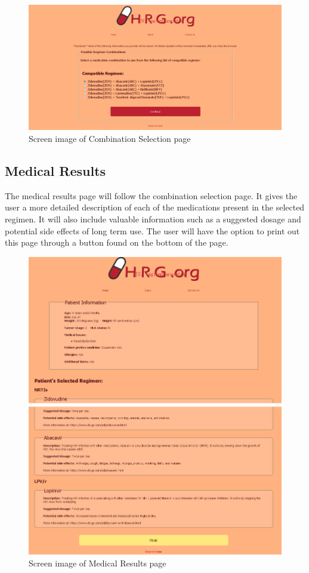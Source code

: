 \documentclass[12pt]{article}
\begin{document}
\begin{figure}[H]
  \centering
  \includegraphics[width=\linewidth]{combo.png}
  \caption{Screen image of Combination Selection page}
  \label{fig:combo}
\end{figure}

\subsection{Medical Results}
The medical results page will follow the combination selection page. It gives the user a more detailed description of each of the medications present in the selected regimen. It will also include valuable information such as a suggested dosage and potential side effects of long term use. The user will have the option to print out this page through a button found on the bottom of the page.

\begin{figure}[H]
  \centering
  \includegraphics[width=\linewidth]{results1.png}
  \caption{Screen image of Medical Results page}
  \label{fig:results1}
\end{figure}
\end{document}
